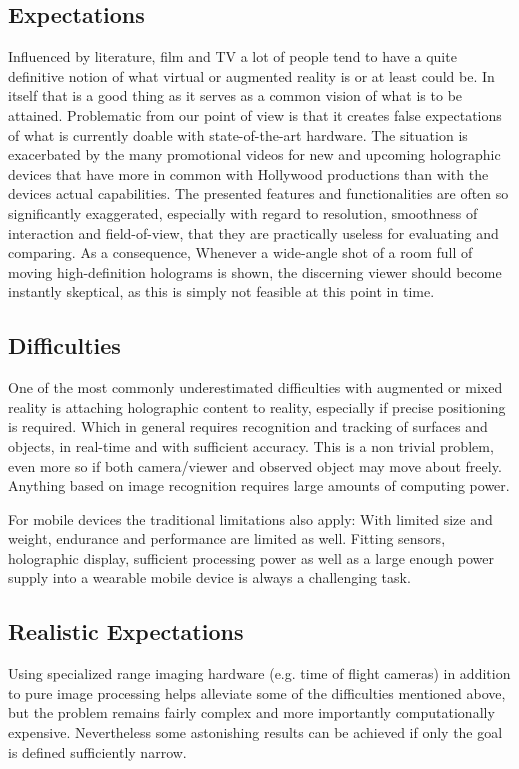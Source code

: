 \documentclass[11pt, a4paper]{IEEEtran}
\begin{document}
\subsection{Expectations}
Influenced by literature, film and TV a lot of people tend to have a quite definitive notion of what virtual or augmented reality is or at least could be. In itself that is a good thing as it serves as a common vision of what is to be attained. Problematic from our point of view is that it creates false expectations of what is currently doable with state-of-the-art hardware. The situation is exacerbated by the many promotional videos for new and upcoming holographic devices that have more in common with Hollywood productions than with the devices actual capabilities. The presented features and functionalities are often so significantly exaggerated, especially with regard to resolution, smoothness of interaction and field-of-view, that they are practically useless for evaluating and comparing. As a consequence, Whenever a wide-angle shot of a room full of moving high-definition holograms is shown, the discerning viewer should become instantly skeptical, as this is simply not feasible at this point in time.

\subsection{Difficulties}
One of the most commonly underestimated difficulties with augmented or mixed reality is attaching holographic content to reality, especially if precise positioning is required. Which in general requires recognition and tracking of surfaces and objects, in real-time and with sufficient accuracy. 
This is a non trivial problem, even more so if both camera/viewer and observed object may move about freely. Anything based on image recognition requires large amounts of computing power. 

For mobile devices the traditional limitations also apply: With limited size and weight, endurance and performance are limited as well. Fitting sensors, holographic display, sufficient processing power as well as a large enough power supply into a wearable mobile device is always a challenging task.

\subsection{Realistic Expectations}
Using specialized range imaging hardware (e.g. time of flight cameras) in addition to pure image processing helps alleviate some of the difficulties mentioned above, but the problem remains fairly complex and more importantly computationally expensive. Nevertheless some astonishing results can be achieved if only the goal is defined sufficiently narrow. 
\end{document}
